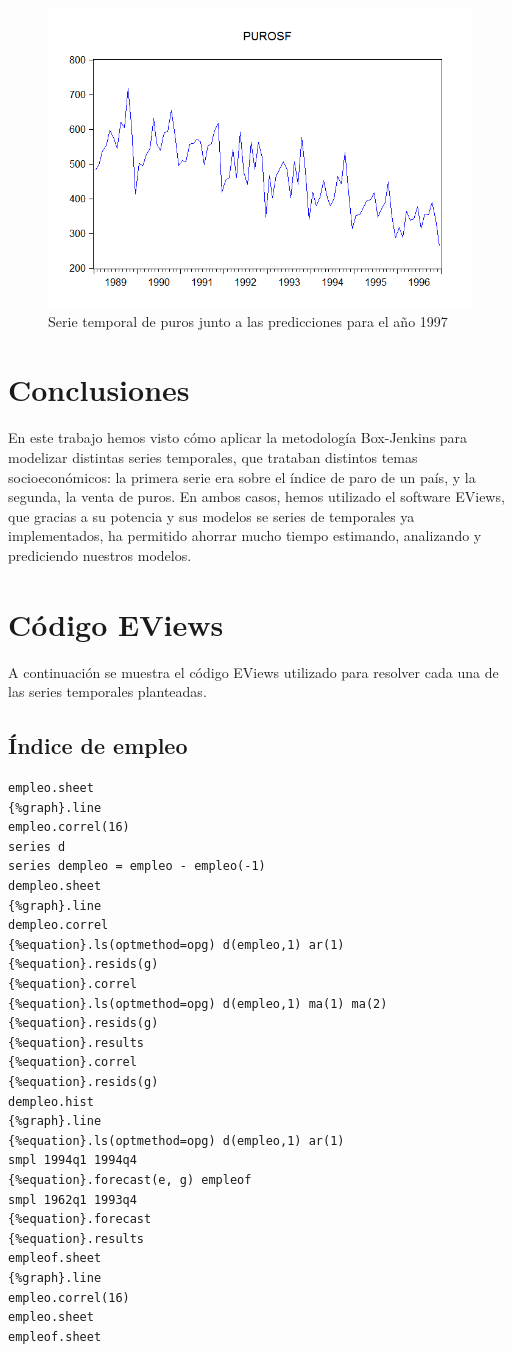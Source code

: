 \documentclass[12pt,a4paper,twoside,openright,titlepage,final]{article}
\begin{document}
\begin{figure}[tbph!]
	\centering
	\includegraphics[width=0.8\linewidth]{imagenes/puros/puros-predicciones.png}
	\caption{Serie temporal de puros junto a las predicciones para el año 1997}
	\label{fig:puros-predicciones}
\end{figure}


\clearpage
\section{Conclusiones}
En este trabajo hemos visto cómo aplicar la metodología Box-Jenkins para modelizar distintas series temporales, que trataban distintos temas socioeconómicos: la primera serie era sobre el índice de paro de un país, y la segunda, la venta de puros. En ambos casos, hemos utilizado el software EViews, que gracias a su potencia y sus modelos se series de temporales ya implementados, ha permitido ahorrar mucho tiempo estimando, analizando y prediciendo nuestros modelos.

\clearpage
\section{Código EViews}

A continuación se muestra el código EViews utilizado para resolver cada una de las series temporales planteadas.

\subsection{Índice de empleo}

\begin{verbatim}
empleo.sheet
{%graph}.line
empleo.correl(16)
series d
series dempleo = empleo - empleo(-1)
dempleo.sheet
{%graph}.line
dempleo.correl
{%equation}.ls(optmethod=opg) d(empleo,1) ar(1)
{%equation}.resids(g)
{%equation}.correl
{%equation}.ls(optmethod=opg) d(empleo,1) ma(1) ma(2)
{%equation}.resids(g)
{%equation}.results
{%equation}.correl
{%equation}.resids(g)
dempleo.hist
{%graph}.line
{%equation}.ls(optmethod=opg) d(empleo,1) ar(1)
smpl 1994q1 1994q4
{%equation}.forecast(e, g) empleof
smpl 1962q1 1993q4
{%equation}.forecast 
{%equation}.results
empleof.sheet
{%graph}.line
empleo.correl(16)
empleo.sheet
empleof.sheet
\end{verbatim}
\end{document}
